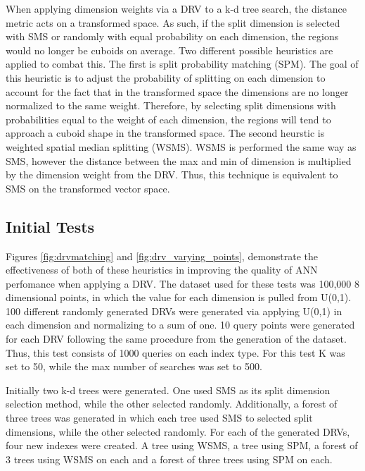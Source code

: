 When applying dimension weights via a DRV to a k-d tree search, the distance metric acts on a transformed space.  As such, if the split dimension is selected with SMS or randomly with equal probability on each dimension, the regions would no longer be cuboids on average.  Two different possible heuristics are applied to combat this.  The first is split probability matching (SPM).  The goal of this heuristic is to adjust the probability of splitting on each dimension to account for the fact that in the transformed space the dimensions are no longer normalized to the same weight.  Therefore, by selecting split dimensions with probabilities equal to the weight of each dimension, the regions will tend to approach a cuboid shape in the transformed space.  The second heurstic is weighted spatial median splitting (WSMS).  WSMS is performed the same way as SMS, however the distance between the max and min of dimension is multiplied by the dimension weight from the DRV.  Thus, this technique is equivalent to SMS on the transformed vector space.

\subsection{Initial Tests}

Figures \ref{fig:drvmatching} and \ref{fig:drv_varying_points}, demonstrate the effectiveness of both of these heuristics in improving the quality of ANN perfomance when applying a DRV.  The dataset used for these tests was 100,000 8 dimensional points, in which the value for each dimension is pulled from U(0,1).  100 different randomly generated DRVs were generated via applying U(0,1) in each dimension and normalizing to a sum of one.  10 query points were generated for each DRV following the same procedure from the generation of the dataset.  Thus, this test consists of 1000 queries on each index type.  For this test K was set to 50, while the max number of searches was set to 500.

Initially two k-d trees were generated.  One used SMS as its split dimension selection method, while the other selected randomly.  Additionally, a forest of three trees was generated in which each tree used SMS to selected split dimensions, while the other selected randomly.  For each of the generated DRVs, four new indexes were created.  A tree using WSMS, a tree using SPM, a forest of 3 trees using WSMS on each and a forest of three trees using SPM on each.

